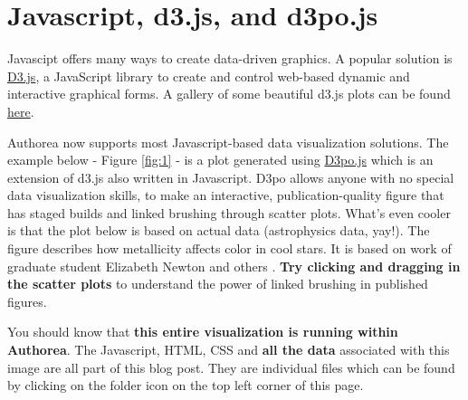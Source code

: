 \section{Javascript, d3.js, and d3po.js}

Javascipt offers many ways to create data-driven graphics. A popular solution is \href{http://d3js.org/}{D3.js}, a JavaScript library to create and control web-based dynamic and interactive graphical forms. A gallery of some beautiful d3.js plots can be found \href{https://github.com/mbostock/d3/wiki/Gallery}{here}.

Authorea now supports most Javascript-based data visualization solutions. The example below - Figure \ref{fig:1} - is a plot generated using \href{http://d3pojs.org/}{D3po.js} which is an extension of d3.js also written in Javascript. D3po allows anyone with no special data visualization skills, to make an interactive, publication-quality figure that has staged builds and linked brushing through scatter plots. What's even cooler is that the plot below is based on actual data (astrophysics data, yay!). The figure describes how metallicity affects color in cool stars. It is based on work of graduate student Elizabeth Newton and others \cite{2014AJ....147...20N}. \textbf{Try clicking and dragging in the scatter plots} to understand the power of linked brushing in published figures.

You should know that \textbf{this entire visualization is running within Authorea}. The Javascript, HTML, CSS and \textbf{all the data} associated with this image are all part of this blog post. They are individual files which can be found by clicking on the folder icon on the top left corner of this page.

 